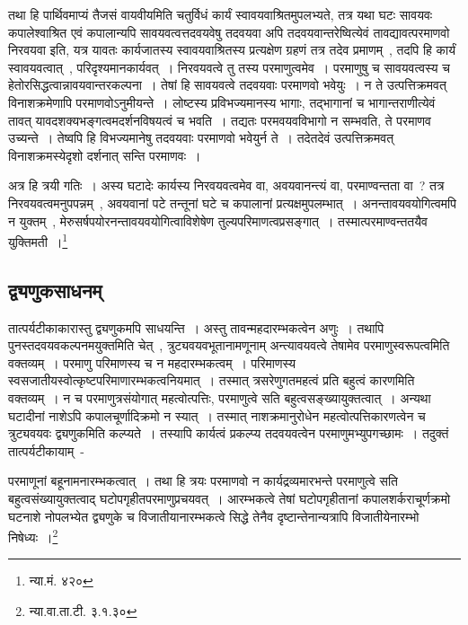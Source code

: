 		{\fontsize{11.7}{0}\selectfont\s तथा हि पार्थिवमाप्यं तैजसं वायवीयमिति चतुर्विधं कार्यं स्वावयवाश्रितमुपलभ्यते, तत्र यथा घटः सावयवः कपालेश्वाश्रित  एवं कपालान्यपि सावयवत्वत्तदवयवेषु तदवयवा अपि तदवयवान्तरेष्वित्येवं तावद्यावत्परमाणवो निरवयवा इति, यत्र यावतः कार्यजातस्य स्वावयवाश्रितस्य प्रत्यक्षेण ग्रहणं तत्र तदेव प्रमाणम्~, तदपि हि कार्यं स्वावयवत्वात्~, परिदृश्यमानकार्यवत्~। निरवयवत्वे तु तस्य परमाणुत्वमेव~। परमाणुषु च सावयवत्वस्य च हेतोरसिद्धत्वान्नावयवान्तरकल्पना~। तेषां हि सावयवत्वे तदवयवाः परमाणवो भवेयुः~। न ते उत्पत्तिक्रमवत् विनाशक्रमेणापि परमाणवोऽनुमीयन्ते~। लोष्टस्य प्रविभज्यमानस्य भागाः, तद्भागानां च भागान्तराणीत्येवं तावत् यावदशक्यभङ्गत्वमदर्शनविषयत्वं च भवति~। तद्यतः परमवयवविभागो न सम्भवति, ते परमाणव उच्यन्ते~। तेष्वपि हि विभज्यमानेषु तदवयवाः परमाणवो भवेयुर्न ते~। तदेतदेवं उत्पत्तिक्रमवत् विनाशक्रमस्येदृशो दर्शनात् सन्ति परमाणवः~।}

		{\fontsize{11.7}{0}\selectfont\s अत्र हि त्रयी गतिः~। अस्य घटादेः कार्यस्य निरवयवत्वमेव वा, अवयवानन्त्यं वा, परमाण्वन्तता वा~? तत्र निरवयवत्वमनुपपन्नम्~, अवयवानां पटे तन्तूनां घटे च कपालानां प्रत्यक्षमुपलम्भात्~। अनन्तावयवयोगित्वमपि न युक्तम्~, मेरुसर्षपयोरनन्तावयवयोगित्वाविशेषेण तुल्यपरिमाणत्वप्रसङ्गात्~। तस्मात्परमाण्वन्ततयैव युक्तिमती~।\footnote{न्या.मं. ४२०}}

		\subsection{द्व्यणुकसाधनम्}

		तात्पर्यटीकाकारास्तु द्व्यणुकमपि साधयन्ति~। अस्तु तावन्महदारम्भकत्वेन अणुः~। तथापि पुनस्तदवयवकल्पनमयुक्तमिति चेत्~, त्रुट्यवयवभूतानामणूनाम् अन्त्यावयवत्वे तेषामेव परमाणुस्वरूपत्वमिति वक्तव्यम्~। परमाणु परिमाणस्य च न महदारम्भकत्वम्~। परिमाणस्य स्वसजातीयस्वोत्कृष्टपरिमाणारम्भकत्वनियमात्~। तस्मात् त्रसरेणुगतमहत्वं प्रति बहुत्वं कारणमिति वक्तव्यम्~। न च परमाणुत्रसंयोगात् महत्वोत्पत्तिः, परमाणुत्वे सति बहुत्वसङ्ख्यायुक्तत्वात्~। अन्यथा घटादीनां नाशेऽपि कपालचूर्णादिक्रमो न स्यात्~। तस्मात् नाशक्रमानुरोधेन महत्वोत्पत्तिकारणत्वेन च त्रुट्यवयवः द्व्यणुकमिति कल्प्यते~। तस्यापि कार्यत्वं प्रकल्प्य तदवयवत्वेन परमाणुमभ्युपगच्छामः~। तदुक्तं तात्पर्यटीकायाम्~- 

		{\fontsize{11.7}{0}\selectfont\s परमाणूनां बहूनामनारम्भकत्वात्~। तथा हि त्रयः परमाणवो न कार्यद्रव्यमारभन्ते परमाणुत्वे सति बहुत्वसंख्यायुक्तत्वाद् घटोपगृहीतपरमाणुप्रचयवत्~। आरम्भकत्वे तेषां घटोपगृहीतानां कपालशर्कराचूर्णक्रमो घटनाशे नोपलभ्येत द्व्यणुके च विजातीयानारम्भकत्वे सिद्धे तेनैव दृष्टान्तेनान्यत्रापि विजातीयेनारम्भो निषेध्यः~।\footnote{न्या.वा.ता.टी. ३.१.३०}}

